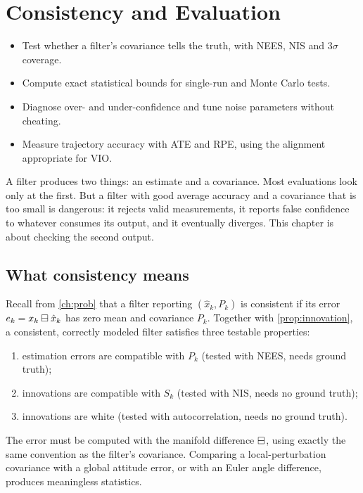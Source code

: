 \chapter{Consistency and Evaluation}
\label{ch:consistency}

\begin{objectives}
\begin{itemize}
  \item Test whether a filter's covariance tells the truth, with NEES, NIS and $3\sigma$ coverage.
  \item Compute exact statistical bounds for single-run and Monte Carlo tests.
  \item Diagnose over- and under-confidence and tune noise parameters without cheating.
  \item Measure trajectory accuracy with ATE and RPE, using the alignment appropriate for VIO.
\end{itemize}
\end{objectives}

A filter produces two things: an estimate and a covariance. Most evaluations look only at the first. But a
filter with good average accuracy and a covariance that is too small is dangerous: it rejects valid measurements,
it reports false confidence to whatever consumes its output, and it eventually diverges. This chapter is about
checking the second output.

\section{What consistency means}

Recall from \cref{ch:prob} that a filter reporting $(\hat x_k, P_k)$ is consistent if its error $e_k = x_k\boxminus\hat x_k$ has
zero mean and covariance $P_k$. Together with \cref{prop:innovation}, a consistent, correctly modeled filter
satisfies three testable properties:
\begin{enumerate}
  \item estimation errors are compatible with $P_k$ (tested with NEES, needs ground truth);
  \item innovations are compatible with $S_k$ (tested with NIS, needs no ground truth);
  \item innovations are white (tested with autocorrelation, needs no ground truth).
\end{enumerate}
The error must be computed with the manifold difference $\boxminus$, using exactly the same convention as the
filter's covariance. Comparing a local-perturbation covariance with a global attitude error, or with an Euler
angle difference, produces meaningless statistics.

